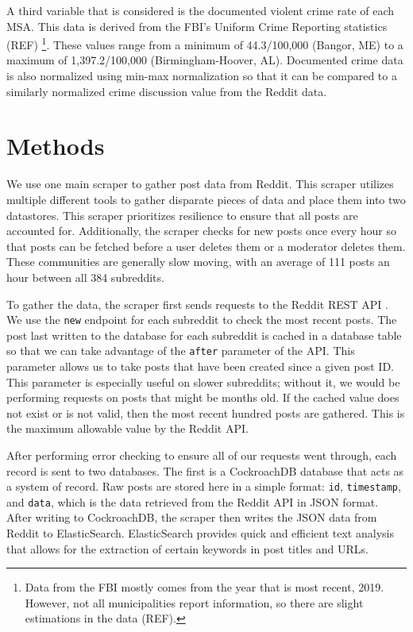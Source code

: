 \documentclass[12pt,oneside, letterpaper]{book}
\begin{document}
\par A third variable that is considered is the documented violent crime rate of each MSA. This data is derived from the FBI's Uniform Crime Reporting statistics (REF) \footnote{Data from the FBI mostly comes from the year that is most recent, 2019. However, not all municipalities report information, so there are slight estimations in the data (REF).}. These values range from a minimum of 44.3/100,000 (Bangor, ME) to a maximum of 1,397.2/100,000 (Birmingham-Hoover, AL). Documented crime data is also normalized using min-max normalization so that it can be compared to a similarly normalized crime discussion value from the Reddit data.

\section{Methods}
\par We use one main scraper to gather post data from Reddit. This scraper utilizes multiple different tools to gather disparate pieces of data and place them into two datastores. This scraper prioritizes resilience to ensure that all posts are accounted for. Additionally, the scraper checks for new posts once every hour so that posts can be fetched before a user deletes them or a moderator deletes them. These communities are generally slow moving, with an average of 111 posts an hour between all 384 subreddits.

\par To gather the data, the scraper first sends requests to the Reddit REST API \cite{reddit}. We use the \texttt{new} endpoint for each subreddit to check the most recent posts. The post last written to the database for each subreddit is cached in a database table so that we can take advantage of the \texttt{after} parameter of the API. This parameter allows us to take posts that have been created since a given post ID. This parameter is especially useful on slower subreddits; without it, we would be performing requests on posts that might be months old. If the cached value does not exist or is not valid, then the most recent hundred posts are gathered. This is the maximum allowable value by the Reddit API.

\par After performing error checking to ensure all of our requests went through, each record is sent to two databases. The first is a CockroachDB database that acts as a system of record. Raw posts are stored here in a simple format: \texttt{id}, \texttt{timestamp}, and \texttt{data}, which is the data retrieved from the Reddit API in JSON format. After writing to CockroachDB, the scraper then writes the JSON data from Reddit to ElasticSearch. ElasticSearch provides quick and efficient text analysis that allows for the extraction of certain keywords in post titles and URLs.
\end{document}

